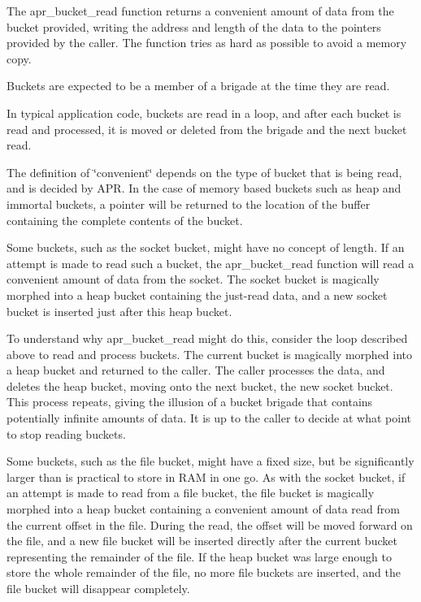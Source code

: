 The apr\-\_\-bucket\-\_\-read function returns a convenient amount of data from the bucket provided, writing the address and length of the data to the pointers provided by the caller. The function tries as hard as possible to avoid a memory copy.

Buckets are expected to be a member of a brigade at the time they are read.

In typical application code, buckets are read in a loop, and after each bucket is read and processed, it is moved or deleted from the brigade and the next bucket read.

The definition of \char`\"{}convenient\char`\"{} depends on the type of bucket that is being read, and is decided by A\-P\-R. In the case of memory based buckets such as heap and immortal buckets, a pointer will be returned to the location of the buffer containing the complete contents of the bucket.

Some buckets, such as the socket bucket, might have no concept of length. If an attempt is made to read such a bucket, the apr\-\_\-bucket\-\_\-read function will read a convenient amount of data from the socket. The socket bucket is magically morphed into a heap bucket containing the just-\/read data, and a new socket bucket is inserted just after this heap bucket.

To understand why apr\-\_\-bucket\-\_\-read might do this, consider the loop described above to read and process buckets. The current bucket is magically morphed into a heap bucket and returned to the caller. The caller processes the data, and deletes the heap bucket, moving onto the next bucket, the new socket bucket. This process repeats, giving the illusion of a bucket brigade that contains potentially infinite amounts of data. It is up to the caller to decide at what point to stop reading buckets.

Some buckets, such as the file bucket, might have a fixed size, but be significantly larger than is practical to store in R\-A\-M in one go. As with the socket bucket, if an attempt is made to read from a file bucket, the file bucket is magically morphed into a heap bucket containing a convenient amount of data read from the current offset in the file. During the read, the offset will be moved forward on the file, and a new file bucket will be inserted directly after the current bucket representing the remainder of the file. If the heap bucket was large enough to store the whole remainder of the file, no more file buckets are inserted, and the file bucket will disappear completely.

